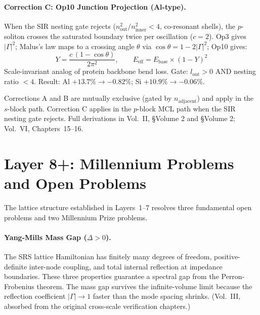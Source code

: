 \paragraph{Correction C: Op10 Junction Projection (Al-type).}
When the SIR nesting gate rejects ($n_\text{out}^2/n_\text{inner}^2 < 4$,
co-resonant shells), the $p$-soliton crosses the saturated boundary twice
per oscillation ($c = 2$).  Op3 gives $|\Gamma|^2$; Malus's law maps to
a crossing angle $\theta$ via $\cos\theta = 1 - 2|\Gamma|^2$; Op10 gives:
\begin{equation}
    Y = \frac{c\,(1 - \cos\theta)}{2\pi^2}, \qquad
    E_\text{eff} = E_\text{base} \times (1 - Y)^2
    \tag{CC}
    \label{eq:correction_c}
\end{equation}
Scale-invariant analog of protein backbone bend loss.
Gate: $l_\text{out} > 0$ AND nesting ratio $< 4$.
Result: Al $+13.7\% \to -0.82\%$; Si $+10.9\% \to -0.06\%$.

Corrections A and B are mutually exclusive (gated by $n_\text{adjacent}$) and
apply in the $s$-block path.  Correction C applies in the $p$-block MCL
path when the SIR nesting gate rejects.
Full derivations in Vol.~II, \S Volume 2 and \S Volume 2;
Vol.~VI, Chapters~15--16.

\section{Layer 8+: Millennium Problems and Open Problems}
\label{sec:layer8plus}

The lattice structure established in Layers~1--7 resolves three
fundamental open problems and two Millennium Prize problems.

\paragraph{Yang-Mills Mass Gap ($\Delta > 0$).}
The SRS lattice Hamiltonian has finitely many degrees of freedom,
positive-definite inter-node coupling, and total internal reflection
at impedance boundaries.  These three properties guarantee a spectral
gap from the Perron-Frobenius theorem.  The mass gap survives the
infinite-volume limit because the reflection coefficient
$|\Gamma| \to 1$\gammaundeclared{} faster than the mode spacing shrinks.
(Vol.~III, absorbed from the original cross-scale verification chapters.)

